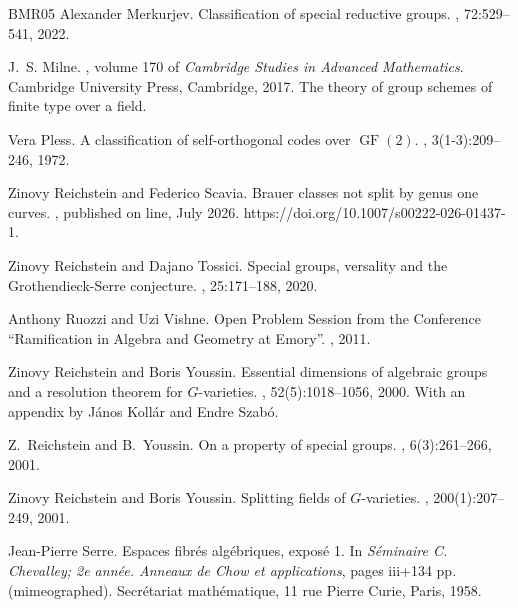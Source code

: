 \begin{thebibliography}{BMR05}
Alexander Merkurjev.
\newblock Classification of special reductive groups.
, 72:529--541, 2022.

J.~S. Milne.
, volume 170 of {\em Cambridge Studies in Advanced Mathematics}.
\newblock Cambridge University Press, Cambridge, 2017.
\newblock The theory of group schemes of finite type over a field.

Vera Pless.
\newblock A classification of self-orthogonal codes over {$\operatorname{GF}(2)$}.
, 3(1-3):209--246, 1972.

Zinovy Reichstein and Federico Scavia.
\newblock Brauer classes not split by genus one curves.
, published on line, July 2026.
\newblock https://doi.org/10.1007/s00222-026-01437-1.

Zinovy Reichstein and Dajano Tossici.
\newblock Special groups, versality and the {G}rothendieck-{S}erre conjecture.
, 25:171--188, 2020.

Anthony Ruozzi and Uzi Vishne.
\newblock Open {P}roblem {S}ession from the {C}onference ``{R}amification in {A}lgebra and {G}eometry at {E}mory''.
, 2011.

Zinovy Reichstein and Boris Youssin.
\newblock Essential dimensions of algebraic groups and a resolution theorem for {$G$}-varieties.
, 52(5):1018--1056, 2000.
\newblock With an appendix by J\'anos Koll\'ar and Endre Szab\'o.

Z.~Reichstein and B.~Youssin.
\newblock On a property of special groups.
, 6(3):261--266, 2001.

Zinovy Reichstein and Boris Youssin.
\newblock Splitting fields of {$G$}-varieties.
, 200(1):207--249, 2001.

Jean-Pierre Serre.
\newblock Espaces fibr\'es alg\'ebriques, expos\'e 1.
\newblock In {\em S\'{e}minaire {C}. {C}hevalley; 2e ann\'{e}e. {A}nneaux de {C}how et applications}, pages iii+134 pp. (mimeographed). Secr\'{e}tariat math\'{e}matique, 11 rue Pierre Curie, Paris, 1958.


\end{thebibliography}
